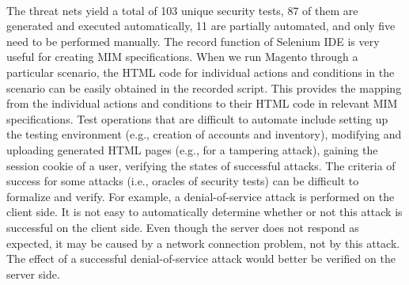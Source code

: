 \paragraph*{} The threat nets yield a total of 103 unique security tests,
87 of them are generated and executed automatically, 11 are
partially automated, and only five need to be performed
manually. The record function of Selenium IDE is very useful
for creating MIM specifications. When we run Magento
through a particular scenario, the HTML code for individual
actions and conditions in the scenario can be easily obtained
in the recorded script. This provides the mapping from the
individual actions and conditions to their HTML code in
relevant MIM specifications. Test operations that are difficult
to automate include setting up the testing environment (e.g.,
creation of accounts and inventory), modifying and uploading
generated HTML pages (e.g., for a tampering attack),
gaining the session cookie of a user, verifying the states of
successful attacks. The criteria of success for some attacks
(i.e., oracles of security tests) can be difficult to formalize and
verify. For example, a denial-of-service attack is performed on the client side. It is not easy to automatically determine whether or not this attack is successful on the client side. Even though the server does not respond as expected, it may be
caused by a network connection problem, not by this attack.
The effect of a successful denial-of-service attack would
better be verified on the server side.
